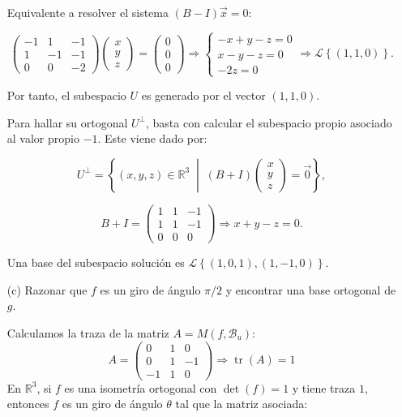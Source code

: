 \documentclass[12pt]{article}
\begin{document}
\begin{ejercicio}[4 puntos]
\begin{enumerate}
			Equivalente a resolver el sistema \( (B - I)\vec{x} = 0 \):
			
			\[
			\left(
			\begin{array}{ccc}
				-1 & 1 & -1 \\
				1 & -1 & -1 \\
				0 & 0 & -2
			\end{array}
			\right)
			\begin{pmatrix}
				x \\ y \\ z
			\end{pmatrix}
			= 
			\begin{pmatrix}
				0 \\ 0 \\ 0
			\end{pmatrix}
			\Rightarrow
			\left\{
			\begin{array}{l}
				-x + y - z = 0 \\
				x - y - z = 0 \\
				-2z = 0
			\end{array}
			\right.
			\Rightarrow
			\mathcal{L}\left\{ (1,1,0) \right\}.
			\]
			
			Por tanto, el subespacio \( U \) es generado por el vector \( (1,1,0) \).
			
			\medskip
			
			Para hallar su ortogonal \( U^\perp \), basta con calcular el subespacio propio asociado al valor propio \( -1 \). Este viene dado por:
			
			\[
			U^\perp = \left\{ 
			(x, y, z) \in \mathbb{R}^3 \;\middle|\; 
			(B + I)
			\begin{pmatrix}
				x \\ y \\ z
			\end{pmatrix}
			=
			\vec{0}
			\right\},
			\]
			
			\[
			B + I = 
			\begin{pmatrix}
				1 & 1 & -1 \\
				1 & 1 & -1 \\
				0 & 0 & 0
			\end{pmatrix}
			\Rightarrow x + y - z = 0.
			\]
			
			Una base del subespacio solución es \( \mathcal{L}\left\{(1,0,1), (1,-1,0)\right\} \).
			\item[(c)] Razonar que $f$ es un giro de ángulo $\pi/2$ y encontrar una base ortogonal de $g$.
			
			Calculamos la traza de la matriz \( A = M(f, \mathcal{B}_u) \):
			\[
			A =
			\begin{pmatrix}
				0 & 1 & 0 \\
				0 & 1 & -1 \\
				-1 & 1 & 0
			\end{pmatrix}
			\Rightarrow \operatorname{tr}(A) = 1
			\]
			En \( \mathbb{R}^3 \), si \( f \) es una isometría ortogonal con \( \det(f) = 1 \) y tiene traza \( 1 \), entonces \( f \) es un giro de ángulo \( \theta \) tal que la matriz asociada:
			

\end{enumerate}
\end{ejercicio}
\end{document}

